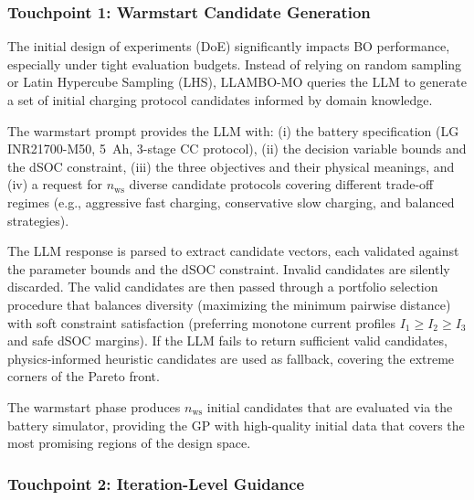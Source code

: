 \documentclass[lettersize,journal]{IEEEtran}
\begin{document}
\subsubsection{Touchpoint 1: Warmstart Candidate Generation}

The initial design of experiments (DoE) significantly impacts BO performance, especially under tight evaluation budgets. Instead of relying on random sampling or Latin Hypercube Sampling (LHS), LLAMBO-MO queries the LLM to generate a set of initial charging protocol candidates informed by domain knowledge.

The warmstart prompt provides the LLM with: (i) the battery specification (LG INR21700-M50, 5~Ah, 3-stage CC protocol), (ii) the decision variable bounds and the dSOC constraint, (iii) the three objectives and their physical meanings, and (iv) a request for $n_{\text{ws}}$ diverse candidate protocols covering different trade-off regimes (e.g., aggressive fast charging, conservative slow charging, and balanced strategies).

The LLM response is parsed to extract candidate vectors, each validated against the parameter bounds and the dSOC constraint. Invalid candidates are silently discarded. The valid candidates are then passed through a portfolio selection procedure that balances diversity (maximizing the minimum pairwise distance) with soft constraint satisfaction (preferring monotone current profiles $I_1 \geq I_2 \geq I_3$ and safe dSOC margins). If the LLM fails to return sufficient valid candidates, physics-informed heuristic candidates are used as fallback, covering the extreme corners of the Pareto front.

The warmstart phase produces $n_{\text{ws}}$ initial candidates that are evaluated via the battery simulator, providing the GP with high-quality initial data that covers the most promising regions of the design space.

\subsubsection{Touchpoint 2: Iteration-Level Guidance}
\end{document}
